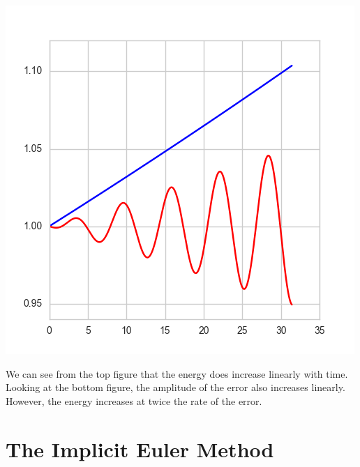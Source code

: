 \documentclass[12pt, letterpaper]{article}
\begin{document}
\begin{center}
\includegraphics[scale=0.8]{energyWithErr.png}
\end{center}

We can see from the top figure that the energy does increase linearly with time. Looking at the bottom figure, the amplitude of the error also increases linearly. However, the energy increases at twice the rate of the error.

\section{The Implicit Euler Method}
\end{document}
